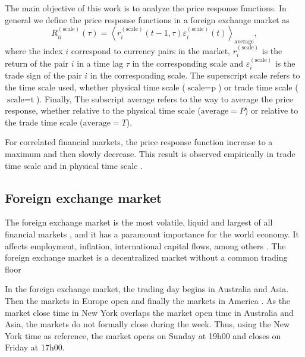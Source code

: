 The main objective of this work is to analyze the price response functions. In
general we define the price response functions in a foreign exchange market as
\begin{equation}\label{eq:response_general}
    R^{\left(\textrm{scale}\right)}_{ii}\left(\tau\right)=\left\langle
    r^{\left(\textrm{scale}\right)}_{i}\left(t-1, \tau\right)
    \varepsilon^{\left(\textrm{scale}\right)}_{i} \left(t\right)\right\rangle
    _{\textrm{average}},
\end{equation}
where the index $i$ correspond to currency pairs in the market,
$r^{\left(\textrm{scale}\right)}_{i}$ is the return of the pair $i$ in a time
lag $\tau$ in the corresponding scale and
$\varepsilon^{\left(\textrm{scale}\right)}_{i}$ is the trade sign of the pair
$i$ in the corresponding scale. The superscript scale refers to the time scale
used, whether physical time scale ($\textrm{scale} = \textrm{p}$) or trade time
scale ($\textrm{scale} = \textrm{t}$). Finally, The subscript average refers to
the way to average the price response, whether relative to the physical time
scale ($\textrm{average} = P$) or relative to the trade time scale
($\textrm{average} = T$).

For correlated financial markets, the price response function increase to a
maximum and then slowly decrease. This result is observed empirically in trade
time scale and in physical time scale
\cite{my_paper_response_financial,Wang_2016_avg}.

\subsection{Foreign exchange market}\label{subsec:forex_market}

The foreign exchange market is the most volatile, liquid and largest of all
financial markets
\cite{forex_liquidity,info_forex,forex_market_micro,intraday_forex,book_forex,book_forex_2}, and it has
a paramount importance for the world economy. It affects employment, inflation,
international capital flows, among others \cite{forex_structure}. The foreign
exchange market is a decentralized market without a common trading floor
\cite{info_forex,forex_market_micro,forex_structure,teach_spread}

In the foreign exchange market, the trading day begins in Australia and Asia.
Then the markets in Europe open and finally the markets in America
\cite{forex_market_micro,forex_structure,book_forex_2}. As the market close time in New York
overlaps the market open time in Australia and Asia, the markets do not
formally close during the week. Thus, using the New York time as reference, the
market opens on Sunday at 19h00 and closes on Friday at 17h00.

